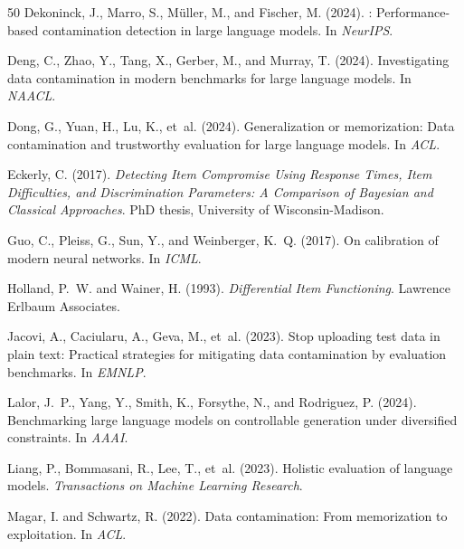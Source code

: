 \documentclass[11pt,a4paper]{article}
\begin{document}
\begin{thebibliography}{50}
Dekoninck, J., Marro, S., Müller, M., and Fischer, M. (2024).
: Performance-based contamination detection in large language models.
\newblock In \emph{NeurIPS}.

Deng, C., Zhao, Y., Tang, X., Gerber, M., and Murray, T. (2024).
\newblock Investigating data contamination in modern benchmarks for large language models.
\newblock In \emph{NAACL}.

Dong, G., Yuan, H., Lu, K., et~al. (2024).
\newblock Generalization or memorization: Data contamination and trustworthy evaluation for large language models.
\newblock In \emph{ACL}.

Eckerly, C. (2017).
\newblock \emph{Detecting Item Compromise Using Response Times, Item Difficulties, and Discrimination Parameters: A Comparison of Bayesian and Classical Approaches}.
\newblock PhD thesis, University of Wisconsin-Madison.

Guo, C., Pleiss, G., Sun, Y., and Weinberger, K.~Q. (2017).
\newblock On calibration of modern neural networks.
\newblock In \emph{ICML}.

Holland, P.~W. and Wainer, H. (1993).
\newblock \emph{Differential Item Functioning}.
\newblock Lawrence Erlbaum Associates.

Jacovi, A., Caciularu, A., Geva, M., et~al. (2023).
\newblock Stop uploading test data in plain text: Practical strategies for mitigating data contamination by evaluation benchmarks.
\newblock In \emph{EMNLP}.

Lalor, J.~P., Yang, Y., Smith, K., Forsythe, N., and Rodriguez, P. (2024).
\newblock Benchmarking large language models on controllable generation under diversified constraints.
\newblock In \emph{AAAI}.

Liang, P., Bommasani, R., Lee, T., et~al. (2023).
\newblock Holistic evaluation of language models.
\newblock \emph{Transactions on Machine Learning Research}.

Magar, I. and Schwartz, R. (2022).
\newblock Data contamination: From memorization to exploitation.
\newblock In \emph{ACL}.


\end{thebibliography}
\end{document}
